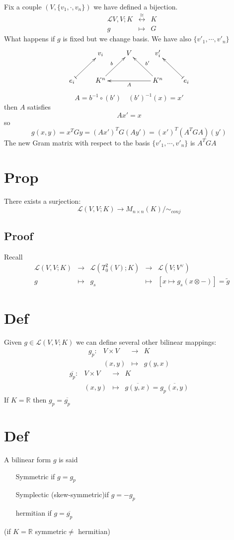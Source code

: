 \documentclass{book}
\begin{document}
Fix a couple $(V,\{v_1,\cdot,v_n\})$ we have defined a bijection.
$$\begin{aligned}
    &\mathscr{L}V,V;K&\stackrel{\cong}\leftrightarrow &K\\
    &g&\mapsto &G
\end{aligned}$$
What happens if $g$ is fixed but we change basis. We have also $\{v'_1,\cdots,v'_n\}$
$$\xymatrix{
    &v_i&V&v'_i&\\
    e_i\ar@{|->}[ur]&K^n\ar[ur]^b&&K^n\ar[ll]^A\ar[ul]_{b'}&e_i\ar@{|->}[lu]
}$$
$$A=b^{-1}\circ(b')\quad (b')^{-1}(x)=x'$$
then $A$ satisfies $$Ax'=x$$
so
$$g(x,y)=x^TGy=(Ax')^TG(Ay')=(x')^T(A^TGA)(y')$$
The new Gram matrix with respect to the basis $\{v'_1,\cdots,v'_n\}$ is $A^TGA$
\section{Prop}
There exists a surjection:
$$\mathscr{L}(V,V;K)\stackrel{ }\rightarrow M_{n\times n}(K)/\sim_{conj}$$
\subsection*{Proof}
Recall
$$
\begin{aligned}
&\mathscr{L}(V,V;K)&\stackrel{ }\rightarrow&\mathscr{L}(T_0^2(V);K)&\stackrel{ }\rightarrow&\mathscr{L}(V;V^\vee)\\
&g&\mapsto& g_s&\mapsto&[x\mapsto g_s(x\otimes-)]=\tilde{g}
\end{aligned}$$
\section{Def}
Given $g\in\mathscr{L}(V,V;K)$ we can define several other bilinear mappings:
$$\begin{aligned}
    g_p:&V\times V&\rightarrow&K\\ &(x,y)&\mapsto& g(y,x)
\end{aligned}$$
$$
\begin{aligned}
    \overline{g_p}:&V\times V&\rightarrow&K\\ &(x,y)&\mapsto& \overline{g(y,x)}=\overline{g_p(x,y)}
\end{aligned}$$
If $K=\mathbb{R}$ then $g_p=\overline{g_p}$
\section{Def}
A bilinear form $g$ is said\begin{itemize}
    \item [Symmetric] if $g=g_p$
    \item [Symplectic](skew-symmetric)if $g=-g_p$
    \item [hermitian] if $g=\overline{g_p}$
\end{itemize}
(if $K=\mathbb{R}$ symmetric$\neq$ hermitian)
\end{document}

